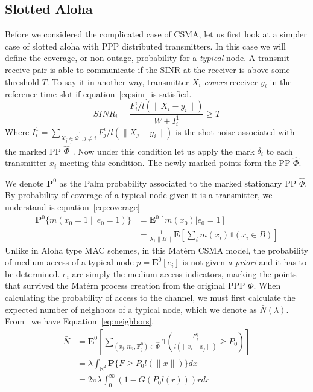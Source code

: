 \documentclass[a4paper]{article}
\begin{document}
\subsection{Slotted Aloha}
%
Before we considered the complicated case of CSMA, let us first look at a simpler case of slotted aloha with PPP distributed transmitters.  In this case we will define the coverage, or non-outage, probability for a \textit{typical} node.  A transmit receive pair is able to communicate if the SINR at the receiver is above some threshold $T$.  To say it in another way, transmitter $X_i$ \textit{covers} receiver $y_i$ in the reference time slot if equation~\eqref{eq:sinr} is satisfied.
%
\begin{equation}\label{eq:sinr}
  SINR_i = \frac{F_i^i/l(\|X_i - y_i\|)}{W + I_i^1} \geq T
\end{equation}
%
Where $I_i^1 = \sum_{X_j \in \hat{\Phi}^1,j \neq i} F_j^i/l(\|X_j-y_i\|) $ is the shot noise associated with the marked PP $\hat{\Phi}^1$. Now under this condition let us apply the mark $\delta_i$ to each transmitter $x_i$ meeting this condition.  The newly marked points form the PP $\hat{\Phi}$.
%
%
\par
%
We denote $\textbf{P}^0$ as the Palm probability associated to the marked stationary PP $\hat{\Phi}$.  By probability of coverage of a typical node given it is a transmitter, we understand is equation~\eqref{eq:coverage}
%
\begin{equation}\label{eq:coverage}
  \begin{split}
  \textbf{P}^0\{m(x_0=1\|e_0=1)\} &= \textbf{E}^0[m(x_0)|e_0=1] \\
  &= \frac{1}{\lambda_1\|B\|}\textbf{E}[\sum_i m(x_i) \mathbb{1}(x_i \in B)]
\end{split}
\end{equation}
%
Unlike in Aloha type MAC schemes, in this Mat\'ern CSMA model, the probability of medium access of a typical node $p = \textbf{E}^0[e_i]$ is not given \textit{a priori} and it has to be determined.  $e_i$ are simply the medium access indicators, marking the points that survived the Mat\'ern process creation from the original PPP $\Phi$.  When calculating the probability of access to the channel, we must first calculate the expected number of neighbors of a typical node, which we denote as $\bar{N}(\lambda)$.  From~\cite{baccelli2009stochasticVII} we have Equation~\eqref{eq:neighbors}.
%
\begin{equation}\label{eq:neighbors}
  \begin{split}
  \bar{N} &= \textbf{E}^0[\sum_{(x_j,m_i,\textbf{F}_j^0)\in\hat{\Phi}}\mathbb{1}(\frac{F_j^0}{l(\|x_i-x_j\|)}\geq P_0)] \\
  &= \lambda\int_{\mathbb{R}^2} \textbf{P}\{F\geq P_0l(\|x\|) \}dx \\
  &= 2\pi \lambda \int_0^\infty (1-G(P_0l(r)))rdr
\end{split}
\end{equation}
\end{document}
